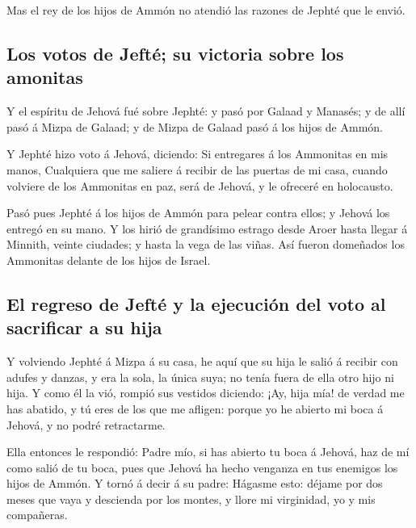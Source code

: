  Mas el rey de los hijos de Ammón no atendió las razones de
Jephté que le envió.

\hypertarget{los-votos-de-jeftuxe9-su-victoria-sobre-los-amonitas}{%
\subsection{Los votos de Jefté; su victoria sobre los
amonitas}\label{los-votos-de-jeftuxe9-su-victoria-sobre-los-amonitas}}

 Y el espíritu de Jehová fué sobre Jephté: y pasó por
Galaad y Manasés; y de allí pasó á Mizpa de Galaad; y de Mizpa de Galaad
pasó á los hijos de Ammón.

 Y Jephté hizo voto á Jehová, diciendo: Si entregares á los
Ammonitas en mis manos,  Cualquiera que me saliere á
recibir de las puertas de mi casa, cuando volviere de los Ammonitas en
paz, será de Jehová, y le ofreceré en holocausto.

 Pasó pues Jephté á los hijos de Ammón para pelear contra
ellos; y Jehová los entregó en su mano.  Y los hirió de
grandísimo estrago desde Aroer hasta llegar á Minnith, veinte ciudades;
y hasta la vega de las viñas. Así fueron domeñados los Ammonitas delante
de los hijos de Israel.

\hypertarget{el-regreso-de-jeftuxe9-y-la-ejecuciuxf3n-del-voto-al-sacrificar-a-su-hija}{%
\subsection{El regreso de Jefté y la ejecución del voto al sacrificar a
su
hija}\label{el-regreso-de-jeftuxe9-y-la-ejecuciuxf3n-del-voto-al-sacrificar-a-su-hija}}

 Y volviendo Jephté á Mizpa á su casa, he aquí que su hija
le salió á recibir con adufes y danzas, y era la sola, la única suya; no
tenía fuera de ella otro hijo ni hija.  Y como él la vió,
rompió sus vestidos diciendo: ¡Ay, hija mía! de verdad me has abatido, y
tú eres de los que me afligen: porque yo he abierto mi boca á Jehová, y
no podré retractarme.

 Ella entonces le respondió: Padre mío, si has abierto tu
boca á Jehová, haz de mí como salió de tu boca, pues que Jehová ha hecho
venganza en tus enemigos los hijos de Ammón.  Y tornó á
decir á su padre: Hágasme esto: déjame por dos meses que vaya y
descienda por los montes, y llore mi virginidad, yo y mis compañeras.

